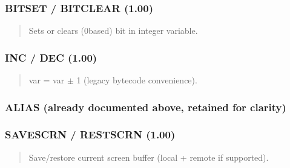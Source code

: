 \documentclass[letterpaper,10pt,english]{sphinxmanual}
\begin{document}
\subsubsection{BITSET / BITCLEAR (1.00)}
\label{\detokenize{ppl:bitset-bitclear-1-00}}\begin{quote}

\sphinxAtStartPar
{}
\begin{description}
\sphinxAtStartPar
Sets or clears (0\sphinxhyphen{}based) bit in integer variable.

\end{description}
\end{quote}


\subsubsection{INC / DEC (1.00)}
\label{\detokenize{ppl:inc-dec-1-00}}\begin{quote}

\sphinxAtStartPar
{}
\begin{description}
\sphinxAtStartPar
var = var \(\pm\) 1 (legacy bytecode convenience).

\end{description}
\end{quote}


\subsubsection{ALIAS (already documented above, retained for clarity)}
\label{\detokenize{ppl:alias-already-documented-above-retained-for-clarity}}

\subsubsection{SAVESCRN / RESTSCRN (1.00)}
\label{\detokenize{ppl:savescrn-restscrn-1-00}}\begin{quote}

\sphinxAtStartPar
{}
\begin{description}
\sphinxAtStartPar
Save/restore current screen buffer (local + remote if supported).

\end{description}
\end{quote}
\end{document}
